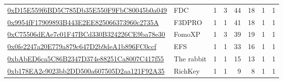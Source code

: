 \begin{tabular}{llrrrrrr}
 \href{https://etherscan.io/address/0xD15E559f6BD5C785Db35E550F9FbC80045b0a049}{0xD15E559f6BD5C785Db35E550F9FbC80045b0a049} &           FDC &       1 &      3 &           44 &         18 &     1 &                 1 \\
 \href{https://etherscan.io/address/0x9954fF17909893B443E2EE825066373960c2735A}{0x9954fF17909893B443E2EE825066373960c2735A} &        F3DPRO &       1 &      1 &           41 &         18 &     1 &                 1 \\
 \href{https://etherscan.io/address/0xC75506dEAe7c01F47BCd330B324226CE9ba78e30}{0xC75506dEAe7c01F47BCd330B324226CE9ba78e30} &        FomoXP &       1 &      3 &           39 &         19 &     1 &                 1 \\
 \href{https://etherscan.io/address/0x0fe2247a20E779a879c647D2b9deA1b896FC0ccf}{0x0fe2247a20E779a879c647D2b9deA1b896FC0ccf} &           EFS &       1 &      1 &           33 &         16 &     1 &                 1 \\
 \href{https://etherscan.io/address/0xbAbED6ca5C86B2347D374e88251Ca8007C417f55}{0xbAbED6ca5C86B2347D374e88251Ca8007C417f55} &    The rabbit &       1 &      1 &           15 &         13 &     1 &                 1 \\
 \href{https://etherscan.io/address/0xb178EA2c9023bb2DD500a607505D2aa121F92A35}{0xb178EA2c9023bb2DD500a607505D2aa121F92A35} &       RichKey &       1 &      1 &            9 &          8 &     1 &                 1 \\
\bottomrule
\end{tabular}
